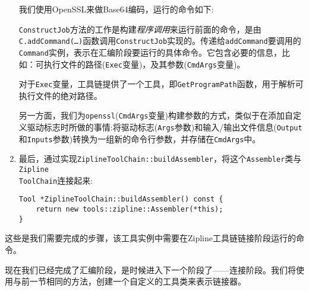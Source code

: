 \begin{enumerate}
我们使用OpenSSL来做Base64编码，运行的命令如下:


\texttt{ConstructJob}方法的工作是构建\textit{程序调用}来运行前面的命令，是由\texttt{C.addCommand(…)}函数调用\texttt{ConstructJob}实现的。传递给\texttt{addCommand}要调用的\texttt{Command}实例，表示在汇编阶段要运行的具体命令。它包含必要的信息，比如：可执行文件的路径(\texttt{Exec}变量)，及其参数(\texttt{CmdArgs}变量)。

对于\texttt{Exec}变量，工具链提供了一个工具，即\texttt{GetProgramPath}函数，用于解析可执行文件的绝对路径。

另一方面，我们为\texttt{openssl}(\texttt{CmdArgs}变量)构建参数的方式，类似于在添加自定义驱动标志时所做的事情:将驱动标志(\texttt{Args}参数)和输入/输出文件信息(\texttt{Output}和\texttt{Inputs}参数)转换为一组新的命令行参数，并存储在\texttt{CmdArgs}中。

\item 最后，通过实现\texttt{ZiplineToolChain::buildAssembler}，将这个\texttt{Assembler}类与\texttt{Zipline\\ToolChain}连接起来:

\begin{lstlisting}[style=styleCXX]
Tool *ZiplineToolChain::buildAssembler() const {
	return new tools::zipline::Assembler(*this);
}
\end{lstlisting}

\end{enumerate}

这些是我们需要完成的步骤，该工具实例中需要在Zipline工具链链接阶段运行的命令。


现在我们已经完成了汇编阶段，是时候进入下一个阶段了——连接阶段。我们将使用与前一节相同的方法，创建一个自定义的工具类来表示链接器。

